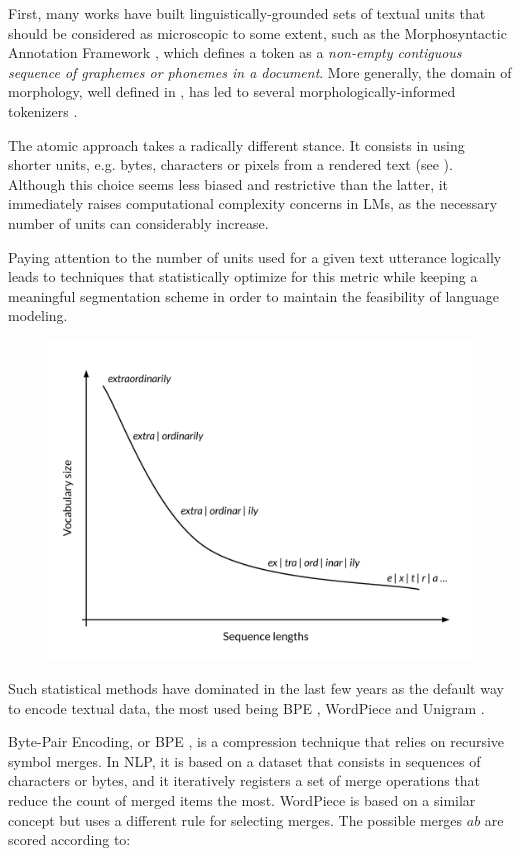 First, many works have built linguistically-grounded sets of textual units that should be considered as microscopic to some extent, such as the Morphosyntactic Annotation Framework \citep{clement_maf}, which defines a token as a \textit{non-empty contiguous sequence of graphemes or phonemes in a document}. More generally, the domain of morphology, well defined in \citet{aronoff2022morphology}, has led to several morphologically-informed tokenizers \citep{saleva-lignos-2021-effectiveness, gronroos-etal-2018-cognate}.

The atomic approach takes a radically different stance. It consists in using shorter units, e.g. bytes, characters or pixels from a rendered text (see ). Although this choice seems less biased and restrictive than the latter, it immediately raises computational complexity concerns in LMs, as the necessary number of units can considerably increase.

Paying attention to the number of units used for a given text utterance logically leads to techniques that statistically optimize for this metric while keeping a meaningful segmentation scheme in order to maintain the feasibility of language modeling. 

\begin{figure}[h]
    \centering
    \includegraphics[width=0.5\linewidth]{sources/related_works/imgs/token_graph.pdf}
    \caption{}
    \label{fig:token_graph}
\end{figure}

Such statistical methods have dominated in the last few years as the default way to encode textual data, the most used being BPE \citep{sennrich-etal-2016-neural}, WordPiece \citep{wu2016google} and Unigram \citep{kudo-2018-subword}.

Byte-Pair Encoding, or BPE \citep{Gage1994bpe}, is a compression technique that relies on recursive symbol merges. In NLP, it is based on a dataset that consists in sequences of characters or bytes, and it iteratively registers a set of merge operations that reduce the count of merged items the most. WordPiece \citep{wu2016google} is based on a similar concept but uses a different rule for selecting merges. The possible merges $ab$ are scored according to:

